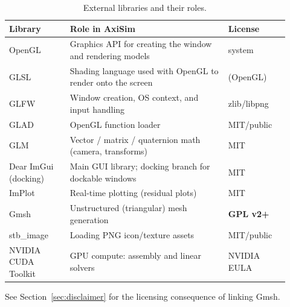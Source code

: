 \documentclass[11pt]{article}
\begin{document}
\begin{table}[h]
\centering
\caption{External libraries and their roles.}
\label{tab:libs}
\begin{tabular}{@{}>{\raggedright\arraybackslash}p{0.20\linewidth}
                   >{\raggedright\arraybackslash}p{0.52\linewidth}
                   >{\raggedright\arraybackslash}p{0.20\linewidth}@{}}
\toprule
\textbf{Library} & \textbf{Role in AxiSim} & \textbf{License} \\
\midrule
OpenGL              & Graphics API for creating the window and rendering models       & system \\
GLSL                & Shading language used with OpenGL to render onto the screen      & (OpenGL) \\
GLFW                & Window creation, OS context, and input handling                  & zlib/libpng \\
GLAD                & OpenGL function loader                                            & MIT/public \\
GLM                 & Vector / matrix / quaternion math (camera, transforms)           & MIT \\
Dear ImGui (docking)& Main GUI library; docking branch for dockable windows           & MIT \\
ImPlot              & Real-time plotting (residual plots)                              & MIT \\
Gmsh                & Unstructured (triangular) mesh generation                        & \textbf{GPL v2+} \\
stb\_image          & Loading PNG icon/texture assets                                  & MIT/public \\
NVIDIA CUDA Toolkit & GPU compute: assembly and linear solvers                         & NVIDIA EULA \\
\bottomrule
\end{tabular}
\end{table}

\noindent See Section~\ref{sec:disclaimer} for the licensing consequence of linking Gmsh.

\end{document}
